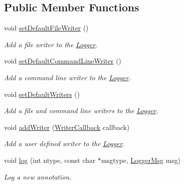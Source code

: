 \subsection*{Public Member Functions}
\begin{DoxyCompactItemize}
\item 
void \hyperlink{classzbe_1_1_logger_a9f8153d2ff5de8545989862aec26756b}{set\+Default\+File\+Writer} ()
\begin{DoxyCompactList}\small\item\em Add a file writer to the \hyperlink{classzbe_1_1_logger}{Logger}. \end{DoxyCompactList}\item 
void \hyperlink{classzbe_1_1_logger_a799c5a801abd4851abcd809d6ef988e3}{set\+Default\+Command\+Line\+Writer} ()
\begin{DoxyCompactList}\small\item\em Add a command line writer to the \hyperlink{classzbe_1_1_logger}{Logger}. \end{DoxyCompactList}\item 
void \hyperlink{classzbe_1_1_logger_a9385884e177d21ed09623f52500ef1b1}{set\+Default\+Writers} ()
\begin{DoxyCompactList}\small\item\em Add a file and command line writers to the \hyperlink{classzbe_1_1_logger}{Logger}. \end{DoxyCompactList}\item 
void \hyperlink{classzbe_1_1_logger_a239d4a3b868b12cccb0f88b5aa06b6a8}{add\+Writer} (\hyperlink{classzbe_1_1_logger_a6b5096e1cd8e8af221619572797cc838}{Writer\+Callback} callback)
\begin{DoxyCompactList}\small\item\em Add a user defined writer to the \hyperlink{classzbe_1_1_logger}{Logger}. \end{DoxyCompactList}\item 
void \hyperlink{classzbe_1_1_logger_af4f5d604d20ead87b807e41cdf323bc6}{log} (int ntype, const char $\ast$msgtype, \hyperlink{classzbe_1_1_logger_msg}{Logger\+Msg} msg)
\begin{DoxyCompactList}\small\item\em Log a new annotation. \end{DoxyCompactList}\end{DoxyCompactItemize}
